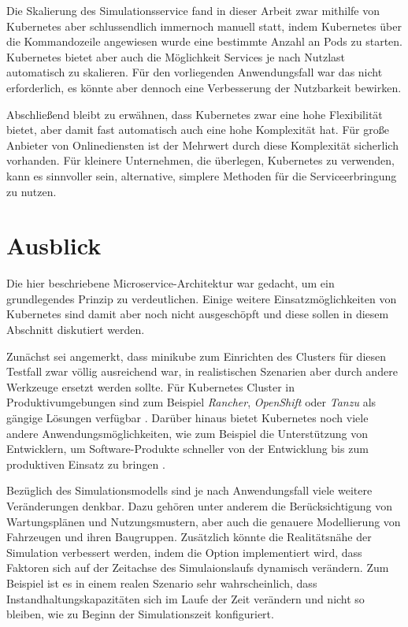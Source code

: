 \documentclass[11pt,a4paper]{article}
\begin{document}
Die Skalierung des Simulationsservice fand in dieser Arbeit zwar mithilfe von Kubernetes
aber schlussendlich immernoch manuell statt, indem Kubernetes über die Kommandozeile angewiesen wurde
eine bestimmte Anzahl an Pods zu starten. Kubernetes bietet aber auch die Möglichkeit 
Services je nach Nutzlast automatisch zu skalieren. Für den vorliegenden 
Anwendungsfall war das nicht erforderlich, es könnte aber dennoch eine Verbesserung 
der Nutzbarkeit bewirken.

Abschließend bleibt zu erwähnen, dass Kubernetes zwar eine hohe Flexibilität bietet,
aber damit fast automatisch auch eine hohe Komplexität hat. Für große Anbieter von Onlinediensten
ist der Mehrwert durch diese Komplexität sicherlich vorhanden.
Für kleinere Unternehmen, die überlegen, Kubernetes zu verwenden, kann es sinnvoller sein,
alternative, simplere Methoden für die Serviceerbringung zu nutzen.

\section{Ausblick}
\label{sec:Ausblick}
Die hier beschriebene Microservice-Architektur war gedacht, um ein grundlegendes Prinzip
zu verdeutlichen. Einige weitere Einsatzmöglichkeiten von Kubernetes sind damit aber noch nicht ausgeschöpft 
und diese sollen in diesem Abschnitt diskutiert werden.

Zunächst sei angemerkt, dass minikube zum Einrichten des Clusters für diesen Testfall
zwar völlig ausreichend war, in realistischen Szenarien aber durch andere Werkzeuge ersetzt werden sollte.
Für Kubernetes Cluster in Produktivumgebungen sind zum Beispiel \emph{Rancher}, \emph{OpenShift} oder \emph{Tanzu} als
gängige Lösungen verfügbar \cite{rancher}. Darüber hinaus bietet Kubernetes noch viele andere 
Anwendungsmöglichkeiten, wie zum Beispiel die Unterstützung von Entwicklern, um Software-Produkte
schneller von der Entwicklung bis zum produktiven Einsatz zu bringen \cite{Schmeling_Dargatz_2022}.

Bezüglich des Simulationsmodells sind je nach Anwendungsfall viele weitere Veränderungen denkbar.
Dazu gehören unter anderem die Berücksichtigung von Wartungsplänen und Nutzungsmustern, aber auch
die genauere Modellierung von Fahrzeugen und ihren Baugruppen. 
Zusätzlich könnte die Realitätsnähe der Simulation verbessert werden, indem die Option
implementiert wird, dass Faktoren sich auf der Zeitachse des Simulaionslaufs dynamisch verändern.
Zum Beispiel ist es in einem realen Szenario sehr wahrscheinlich, dass Instandhaltungskapazitäten
sich im Laufe der Zeit verändern und nicht so bleiben, wie zu Beginn der Simulationszeit konfiguriert.
\end{document}
